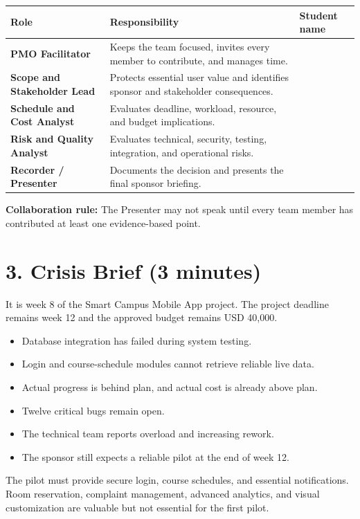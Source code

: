 \documentclass[11pt,a4paper]{article}
\begin{document}
\begin{center}
\begin{tabularx}{\textwidth}{>{\bfseries}p{3.5cm} Y p{3.2cm}}
\toprule
Role & Responsibility & Student name \\
\midrule
PMO Facilitator & Keeps the team focused, invites every member to contribute, and manages time. & \\
Scope and Stakeholder Lead & Protects essential user value and identifies sponsor and stakeholder consequences. & \\
Schedule and Cost Analyst & Evaluates deadline, workload, resource, and budget implications. & \\
Risk and Quality Analyst & Evaluates technical, security, testing, integration, and operational risks. & \\
Recorder / Presenter & Documents the decision and presents the final sponsor briefing. & \\
\bottomrule
\end{tabularx}
\end{center}

\textbf{Collaboration rule:} The Presenter may not speak until every team member has contributed at least one evidence-based point.

\section{3. Crisis Brief (3 minutes)}

It is week 8 of the Smart Campus Mobile App project. The project deadline remains week 12 and the approved budget remains USD 40,000.

\begin{itemize}
  \item Database integration has failed during system testing.
  \item Login and course-schedule modules cannot retrieve reliable live data.
  \item Actual progress is behind plan, and actual cost is already above plan.
  \item Twelve critical bugs remain open.
  \item The technical team reports overload and increasing rework.
  \item The sponsor still expects a reliable pilot at the end of week 12.
\end{itemize}

The pilot must provide secure login, course schedules, and essential notifications. Room reservation, complaint management, advanced analytics, and visual customization are valuable but not essential for the first pilot.
\end{document}

